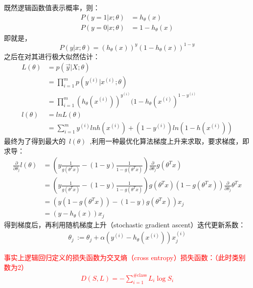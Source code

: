 既然逻辑函数值表示概率，则：
\begin{equation}\nonumber
\begin{split}
  P(y=1|x;\theta) &= h_\theta(x)\\
  P(y=0|x;\theta) &= 1-h_\theta(x)
\end{split}
\end{equation}
即就是，
$$P(y|x;\theta)=(h_\theta(x))^y(1-h_\theta(x))^{1-y}$$
之后在对其进行极大似然估计：
\begin{equation}\nonumber
\begin{split}
  L(\theta) &= p(\overrightarrow{y}|X;\theta)\\
            &= \prod_{i=1}^{m}p(y^{(i)}|x^{(i)};\theta)\\
            &= \prod_{i=1}^{m}(h_\theta(x^{(i)}))^{y^{(i)}}(1-h_\theta(x^{(i)})^{1-y^{(i)}}\\
  l(\theta) &= ln L(\theta)\\
            &= \sum_{i=1}^{m}y^{(i)}lnh(x^{(i)})+(1-y^{(i)})ln(1-h(x^{(i)}))
\end{split}
\end{equation}
最终为了得到最大的~$l(\theta)$~,利用一种最优化算法梯度上升来求取，要求梯度，即求导：
\begin{equation}\nonumber
\begin{split}
  \frac{\partial}{\partial\theta_j}l(\theta) &= ( y\frac{1}{g(\theta^Tx)}-(1-y)\frac{1}{1-g(\theta^Tx)})\frac{\partial}{\partial\theta_j}g(\theta^Tx)\\
            &= ( y\frac{1}{g(\theta^Tx)}-(1-y)\frac{1}{1-g(\theta^Tx)})g(\theta^Tx)(1-g(\theta^Tx))\frac{\partial}{\partial\theta_j}\theta^Tx\\
            &= (y(1-g(\theta^Tx))-(1-y)g(\theta^Tx))x_j\\
            &= (y-h_\theta(x))x_j
\end{split}
\end{equation}
得到梯度后，再利用随机梯度上升（stochastic gradient ascent）迭代更新系数：
\begin{equation}\nonumber
\begin{split}
  \theta_j ~:=\theta_j+\alpha(y^{(i)}-h_\theta(x^{(i)}))x_j^{(i)}
\end{split}
\end{equation}

\noindent\textcolor{red}{事实上逻辑回归定义的损失函数为交叉熵（cross entropy）损失函数：（此时类别数为2）
\begin{equation}\nonumber
\begin{split}
  D(S,L)=-\sum_{i=1}^{\text{\#class}}L_i\log S_i
\end{split}
\end{equation}}

